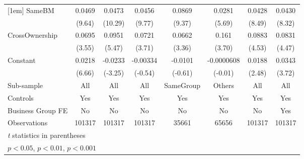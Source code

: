 {\begin{tabular}{l*{7}{c}}
[1em]
SameBM          &   0.0469\sym{***}&   0.0473\sym{***}&   0.0456\sym{***}&   0.0869\sym{***}&   0.0281\sym{***}&   0.0428\sym{***}&   0.0430\sym{***}\\
                &   (9.64)         &  (10.29)         &   (9.77)         &   (9.37)         &   (5.69)         &   (8.49)         &   (8.32)         \\
[1em]
CrossOwnership  &   0.0695\sym{***}&   0.0951\sym{***}&   0.0721\sym{***}&   0.0662\sym{**} &    0.161\sym{***}&   0.0883\sym{***}&   0.0831\sym{***}\\
                &   (3.55)         &   (5.47)         &   (3.71)         &   (3.36)         &   (3.70)         &   (4.53)         &   (4.47)         \\
[1em]
Constant        &   0.0218\sym{***}&  -0.0233\sym{**} & -0.00334         &  -0.0101         &-0.0000608         &   0.0188\sym{*}  &   0.0343\sym{***}\\
                &   (6.66)         &  (-3.25)         &  (-0.54)         &  (-0.61)         &  (-0.01)         &   (2.48)         &   (3.72)         \\
\hline
Sub-sample      &      All         &      All         &      All         &SameGroup         &   Others         &      All         &      All         \\
Controls        &      Yes         &      Yes         &      Yes         &      Yes         &      Yes         &      Yes         &      Yes         \\
Business Group FE&       No         &       No         &       No         &       No         &       No         &       No         &      Yes         \\
Observations    &   101317         &   101317         &   101317         &    35661         &    65656         &   101317         &   101317         \\
\hline\hline
\multicolumn{8}{l}{\footnotesize \textit{t} statistics in parentheses}\\
\multicolumn{8}{l}{\footnotesize \sym{*} \(p<0.05\), \sym{**} \(p<0.01\), \sym{***} \(p<0.001\)}\\
\end{tabular}
}
